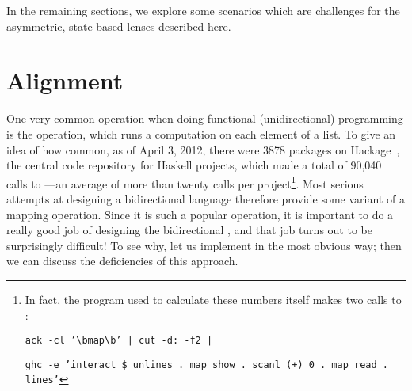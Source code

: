 In the remaining sections, we explore some scenarios which are challenges
for the asymmetric, state-based lenses described here.

\section{Alignment}
\label{sec:intro-alignment}

One very common operation when doing functional (unidirectional) programming
is the \map operation, which runs a computation on each element of a list.
To give an idea of how common, as of April 3, 2012, there were 3878 packages
on Hackage~\cite{Hackage2012}, the central code repository for Haskell
projects, which made a total of 90,040 calls to \map---an average of more
than twenty calls per project\footnote{In fact, the program used to
calculate these numbers itself makes two calls to \map:

\noindent\texttt{ack -cl '\textbackslash bmap\textbackslash b' | cut -d:\ -f2 |}

\noindent\texttt{ghc -e 'interact \$ unlines . map show . scanl (+) 0 . map read . lines'}
}. Most serious attempts at designing a bidirectional language therefore
provide some variant of a mapping operation. Since it is such a popular
operation, it is important to do a really good job of designing the
bidirectional \map, and that job turns out to be surprisingly difficult! To
see why, let us implement \map in the most obvious way; then we can discuss
the deficiencies of this approach.

